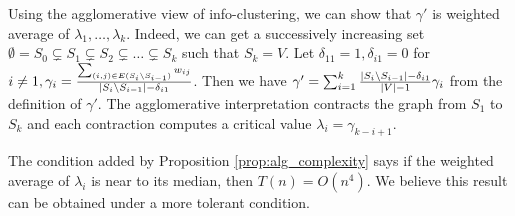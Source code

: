 \documentclass[runningheads]{llncs}
\begin{document}
\begin{remark}
		Using the agglomerative view of info-clustering, we can show that 	$\gamma'$ is weighted average of $\lambda_1, \dots, \lambda_k$. Indeed, we can
		get a successively increasing set $\emptyset = S_0 \subsetneq S_1 \subsetneq S_2 \subsetneq \dots \subsetneq S_k$ such that $S_k = V$. Let $\delta_{11}=1, \delta_{i1}=0$ for $i\neq 1, \gamma_i = \frac{\sum_{(i,j) \in E(S_i\backslash S_{i-1})} w_{ij}}{\lvert S_i\backslash S_{i-1}\rvert- \delta_{i1}}$. Then we have $\gamma' = \sum_{i=1}^k \frac{\lvert S_i \backslash S_{i-1}\rvert - \delta_{i1}}{\lvert V\rvert - 1}\gamma_i$ from the definition of $\gamma'$. The agglomerative interpretation contracts the graph from $S_1$ to $S_k$ and each contraction computes a critical value $\lambda_i = \gamma_{k-i+1}$.
		
		The condition added by Proposition \ref{prop:alg_complexity} says if the weighted average of $\lambda_i$ is near to its median, then $T(n) = O(n^4)$. We believe this result can be obtained under a more tolerant condition.
\end{remark}		
\end{document}
